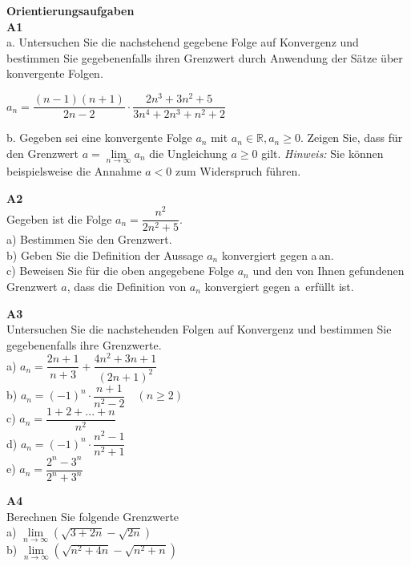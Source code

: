 \documentclass[landscape,twocolumn,a4paper]{article}
\begin{document}
\textbf{Orientierungsaufgaben} \\

\textbf{A1} \\
a. Untersuchen Sie die nachstehend gegebene Folge auf Konvergenz und bestimmen Sie gegebenenfalls
ihren Grenzwert durch Anwendung der Sätze über konvergente Folgen. 

$a_n = \dfrac{(n-1)(n+1)}{2n-2} \cdot \dfrac{2n^3+3n^2+5}{3n^4+2n^3+n^2+2}$ 

b. Gegeben sei eine konvergente Folge $a_n$ mit $a_n \in \mathbb{R}, a_n \ge 0$. Zeigen Sie, dass
für den Grenzwert $a = \lim \limits_{n \to \infty} a_n$ die Ungleichung $a \ge 0$ gilt. \textit{Hinweis:} Sie
können beispielsweise die Annahme $a < 0$ zum Widerspruch führen.
\bigskip

\newpage

\textbf{A2} \\
Gegeben ist die Folge $a_n = \dfrac{n^2}{2n^2+5}$. \\
a) Bestimmen Sie den Grenzwert. \\
b) Geben Sie die Definition der Aussage \glqq $a_n$ konvergiert gegen a\grqq\,an. \\
c) Beweisen Sie für die oben angegebene Folge $a_n$ und den von Ihnen gefundenen Grenzwert $a$, dass die
Definition von \glqq $a_n$ konvergiert gegen a\grqq\ erfüllt ist.\\
\bigskip

\textbf{A3} \\
Untersuchen Sie die nachstehenden Folgen auf Konvergenz und bestimmen Sie gegebenenfalls ihre Grenzwerte. \\
a) $a_n = \dfrac{2n+1}{n+3} + \dfrac{4n^2+3n+1}{(2n+1)^2} $\\
b) $a_n = (-1)^n \cdot \dfrac{n+1}{n^2-2} \quad (n \ge 2)$ \\
c) $a_n = \dfrac{1+2+...+n}{n^2} $ \\
d) $a_n = (-1)^n \cdot \dfrac{n^2-1}{n^2+1}$ \\
e) $a_n = \dfrac{2^n-3^n}{2^n+3^n}$

\textbf{A4} \\
Berechnen Sie folgende Grenzwerte \\
a) $\lim \limits_{n \to \infty} (\sqrt{3+2n}-\sqrt{2n})$ \\
b) $\lim \limits_{n \to \infty} (\sqrt{n^2+4n}-\sqrt{n^2+n})$ \\
\end{document}
